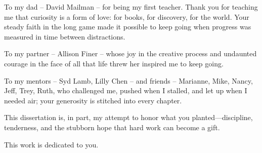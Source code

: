 %

To my dad -- David Mailman -- for being my first teacher.  Thank you for teaching me that curiosity is a form of love: for books, for discovery, for the world. Your steady faith in the long game made it possible to keep going when progress was measured in time between distractions.

To my partner -- Allison Finer -- whose joy in the creative process and undaunted courage in the face of all that life threw her inspired me to keep going.

To my mentors -- Syd Lamb, Lilly Chen -- and friends -- Marianne, Mike, Nancy, Jeff, Trey, Ruth, who challenged me, pushed when I stalled, and let up when I needed air; your generosity is stitched into every chapter.

This dissertation is, in part, my attempt to honor what you planted—discipline, tenderness, and the stubborn hope that hard work can become a gift.

This work is dedicated to you.

